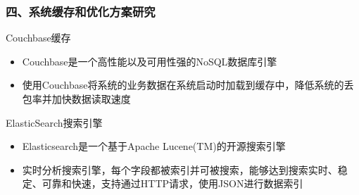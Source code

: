 \documentclass{beamer}
\begin{document}
\begin{frame}
\frametitle{四、系统缓存和优化方案研究}
  \begin{block}{Couchbase缓存\cite{couchbase1} }
    \begin{itemize}
      \item Couchbase是一个高性能以及可用性强的NoSQL数据库引擎
      \item 使用Couchbase将系统的业务数据在系统启动时加载到缓存中，降低系统的丢包率并加快数据读取速度 
    \end{itemize} 
  \end{block}
  \begin{block}{ElasticSearch搜索引擎\cite{elasticsearch1} }
    \begin{itemize}
      \item Elasticsearch是一个基于Apache Lucene(TM)的开源搜索引擎
      \item 实时分析搜索引擎，每个字段都被索引并可被搜索，能够达到搜索实时、稳定、可靠和快速，支持通过HTTP请求，使用JSON进行数据索引\cite{elasticsearch2}
    \end{itemize} 
  \end{block}
\end{frame}
\end{document}
